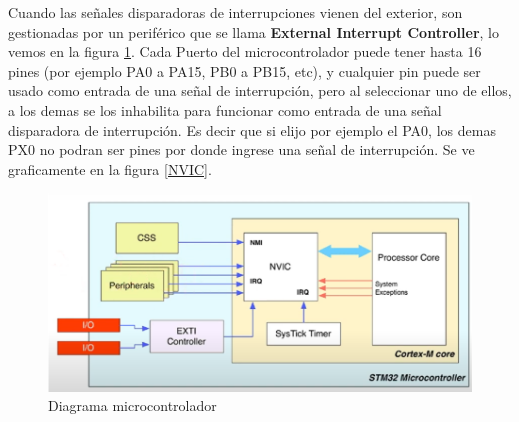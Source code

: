 \documentclass[a4paper,12pt]{report} %
\begin{document}
Cuando las señales disparadoras de interrupciones vienen del exterior, son gestionadas por un periférico que se llama \textbf{External Interrupt Controller}, lo vemos en la figura \ref{bloques}. Cada Puerto del microcontrolador puede tener hasta 16 pines (por ejemplo PA0 a PA15, PB0 a PB15, etc), y cualquier pin puede ser usado como entrada de una señal de interrupción, pero al seleccionar uno de ellos, a los demas se los inhabilita para funcionar como entrada de una señal disparadora de interrupción. Es decir que si elijo por ejemplo el PA0, los demas PX0 no podran ser pines por donde ingrese una señal de interrupción. Se ve graficamente en la figura \ref{NVIC}.

\begin{figure}[H]
	\centering
	\includegraphics[scale=0.5]{Imagenes/stm/bloquesstm32}
	\caption{Diagrama microcontrolador}
	\label{bloques}
\end{figure}
\end{document}
